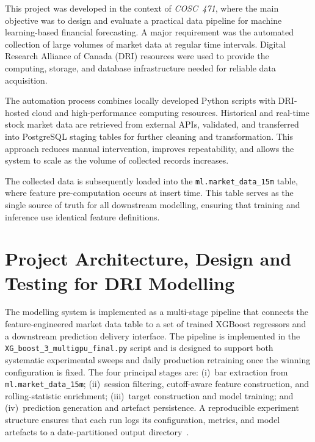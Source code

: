 \documentclass[conference]{IEEEtran}
\begin{document}
This project was developed in the context of \textit{COSC~471}, where the main objective was to design and evaluate a practical data pipeline for machine learning-based financial forecasting. A major requirement was the automated collection of large volumes of market data at regular time intervals. Digital Research Alliance of Canada (DRI) resources were used to provide the computing, storage, and database infrastructure needed for reliable data acquisition.

The automation process combines locally developed Python scripts with DRI-hosted cloud and high-performance computing resources. Historical and real-time stock market data are retrieved from external APIs, validated, and transferred into PostgreSQL staging tables for further cleaning and transformation. This approach reduces manual intervention, improves repeatability, and allows the system to scale as the volume of collected records increases.

The collected data is subsequently loaded into the \texttt{ml.market\_data\_15m} table, where feature pre-computation occurs at insert time. This table serves as the single source of truth for all downstream modelling, ensuring that training and inference use identical feature definitions.

\section{Project Architecture, Design and Testing for DRI Modelling}\label{sec:architecture}

The modelling system is implemented as a multi-stage pipeline that connects the feature-engineered market data table to a set of trained XGBoost regressors and a downstream prediction delivery interface. The pipeline is implemented in the \texttt{XG\_boost\_3\_multigpu\_final.py} script and is designed to support both systematic experimental sweeps and daily production retraining once the winning configuration is fixed. The four principal stages are: (i)~bar extraction from \texttt{ml.market\_data\_15m}; (ii)~session filtering, cutoff-aware feature construction, and rolling-statistic enrichment; (iii)~target construction and model training; and (iv)~prediction generation and artefact persistence. A reproducible experiment structure ensures that each run logs its configuration, metrics, and model artefacts to a date-partitioned output directory~\cite{peng2011reproducible}.
\end{document}
